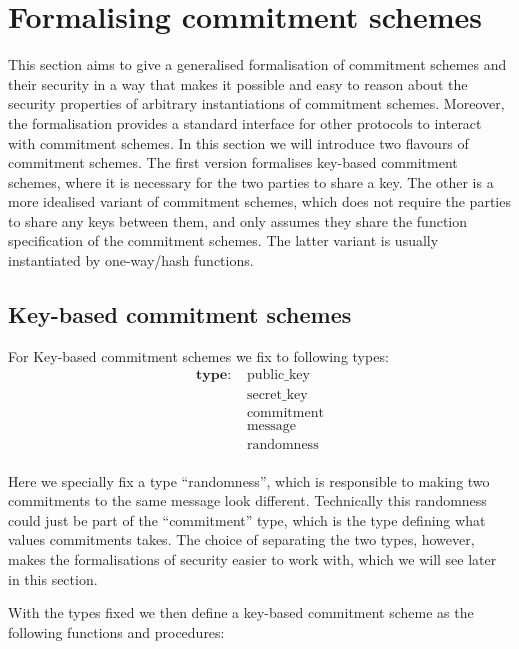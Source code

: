 \chapter{Formalising commitment schemes}
\label{ch:formal_commitment}
This section aims to give a generalised formalisation of commitment schemes and
their security in a way that makes it possible and easy to reason about the
security properties of arbitrary instantiations of commitment schemes. Moreover,
the formalisation provides a standard interface for other protocols to interact
with commitment schemes.
In this section we will introduce two flavours of commitment schemes. The first
version formalises key-based commitment schemes, where it is necessary for the
two parties to share a key. The other is a more idealised variant of commitment
schemes, which does not require the parties to share any keys between them, and
only assumes they share the function specification of the commitment schemes.
The latter variant is usually instantiated by one-way/hash functions.

\section{Key-based commitment schemes}
\label{sec:commitment:key-based}
For Key-based commitment schemes we fix to following types:
\begin{align*}
  \textbf{type: } &\text{public\_key} \\
  &\text{secret\_key} \\
  &\text{commitment} \\
  &\text{message} \\
  &\text{randomness} \\
\end{align*}

Here we specially fix a type ``randomness'', which is responsible to making two
commitments to the same message look different. Technically this randomness
could just be part of the ``commitment'' type, which is the type defining what
values commitments takes. The choice of separating the two types, however, makes
the formalisations of security easier to work with, which we will see later in
this section.

With the types fixed we then define a key-based commitment scheme as the
following functions and procedures:

